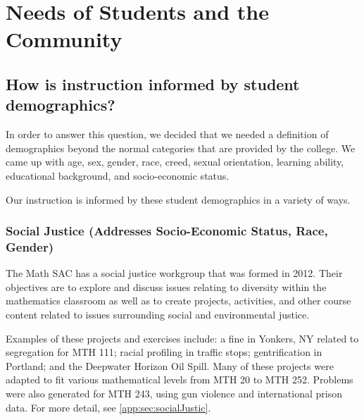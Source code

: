 \chapter{Needs of Students and the Community}
\section{How is instruction informed by student demographics?}
In order to answer this question, we decided that we needed a definition of demographics beyond the normal categories that are provided by the college. We came up with age, sex, gender, race, creed, sexual orientation, learning ability, educational background, and socio-economic status.

Our instruction is informed by these student demographics in a variety of ways.

\subsection{Social Justice (Addresses Socio-Economic Status, Race, Gender)}
The Math SAC has a social justice workgroup that was formed in 2012.  Their objectives are to explore and discuss issues relating to diversity within the mathematics classroom as well as to create projects, activities, and other course content related to issues surrounding social and environmental justice.

Examples of these projects and exercises include: a fine in Yonkers, NY related to segregation
for MTH 111; racial profiling in traffic stops; gentrification in Portland; and the Deepwater Horizon Oil Spill. Many of these projects were adapted to fit various mathematical levels from MTH 20 to MTH 252. Problems were also generated for MTH 243, using gun violence and international prison data. For more detail, see \vref{app:sec:socialJustic}.

